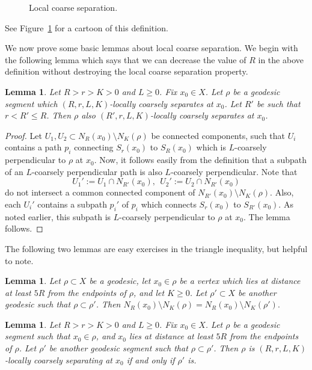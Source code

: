 \documentclass[10pt,a4paper]{amsart}
\newtheorem{lemma}[theorem]{Lemma}
\theoremstyle{definition}
\begin{document}
\begin{figure}[t]
\begin{tikzpicture}[x=0.75pt,y=0.75pt,yscale=-1,xscale=1]
\end{tikzpicture}

    \caption{Local coarse separation.}
    \label{fig:lcs}
\end{figure}

See Figure~\ref{fig:lcs} for a cartoon of this definition. 

We now prove some basic lemmas about local coarse separation. 
We begin with the following lemma which says that we can decrease the value of $R$ in the above definition without destroying the local coarse separation property. 

\begin{lemma}\label{lem:shrink-R}
    Let $R >  r > K > 0$ and $L \geq 0$. Fix $x_0 \in X$. Let $\rho$ be a geodesic segment which $(R,r, L, K)$-locally coarsely separates at $x_0$. Let $R'$ be such that $r < R' \leq R$. 
Then $\rho$ also $(R',r, L, K)$-locally coarsely separates at $x_0$. 
\end{lemma}

\begin{proof}
    Let $U_1, U_2 \subset N_R(x_0) \setminus N_K(\rho)$ be connected components, such that $U_i$ contains a path $p_i$ connecting $S_r(x_0)$ to $S_R(x_0)$ which is $L$-coarsely perpendicular to $\rho$ at $x_0$.  
    Now, it follows easily from the definition that a subpath of an $L$-coarsely perpendicular path is also $L$-coarsely perpendicular. Note that 
    $$U_1' := U_1 \cap N_{R'}(x_0), \ \ U_2' := U_2 \cap N_{R'}(x_0)$$ do not intersect a common connected component of $N_{R'}(x_0) \setminus N_K(\rho)$. Also, each $U_i'$ contains a subpath $p_i'$ of $p_i$ which connects $S_r(x_0)$ to $S_{R'}(x_0)$. As noted earlier, this subpath is $L$-coarsely perpendicular to $\rho$ at $x_0$. The lemma follows. 
\end{proof}


The following two lemmas are easy exercises in the triangle inequality, but helpful to note. 


\begin{lemma}\label{lem:complement-agrees}
    Let $\rho \subset X$ be a geodesic, let $x_0 \in \rho$ be a vertex which lies at distance at least $5R$ from the endpoints of $\rho$, and let $K \geq 0$. 
    Let $\rho' \subset X$ be another geodesic such that $\rho \subset \rho'$. Then 
    $
    N_R(x_0) \setminus N_K(\rho) = N_R(x_0) \setminus N_K(\rho'). 
    $
\end{lemma}




\begin{lemma}\label{lem:trim-grow}
    Let $R >  r > K > 0$ and $L \geq 0$. Fix $x_0 \in X$. Let $\rho$ be a geodesic segment such that $x_0 \in \rho$, and $x_0$ lies at distance at least $5R$ from the endpoints of $\rho$. Let $\rho'$ be another geodesic segment such that $\rho \subset \rho'$. 
Then $\rho$ is $(R,r, L, K)$-locally coarsely separating at $x_0$ if and only if $\rho'$ is. 
\end{lemma}
\end{document}
